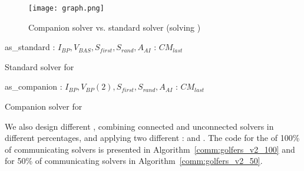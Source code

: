 \begin{figure}
\centering
\texttt{[image: graph.png]} 
\caption{Companion solver vs. standard solver (solving \sgp)}
\label{fig:solversgolfers}
\end{figure}

\begin{algorithm}[h]
\dontprintsemicolon
\SetNoline
{}
   as\_standard\;
\algoindent {} : $I_{BP}, V_{BAS}, S_{first}, S_{rand}, A_{AI}$ \;
\algoindent {} : $CM_{last}$ \;
\caption{Standard solver for \SGP}\label{as:golfers_full}
\end{algorithm}

\begin{algorithm}[!h]
\dontprintsemicolon
\SetNoline
{}
   as\_companion\;
\algoindent {} : $I_{BP}, V_{BP}(2), S_{first}, S_{rand}, A_{AI}$ \;
\algoindent {} : $CM_{last}$ \;
\caption{Companion solver for \SGP}\label{as:golfers_partial}
\end{algorithm}

We also design different \commstrs, combining connected and unconnected solvers in different percentages, and applying two different \commopers: \oneTone{} and \oneTn. The code for the \commstr{} of 100\% of communicating solvers is presented in Algorithm~\ref{comm:golfers_v2_100} and for 50\% of communicating solvers in Algorithm~\ref{comm:golfers_v2_50}. 


